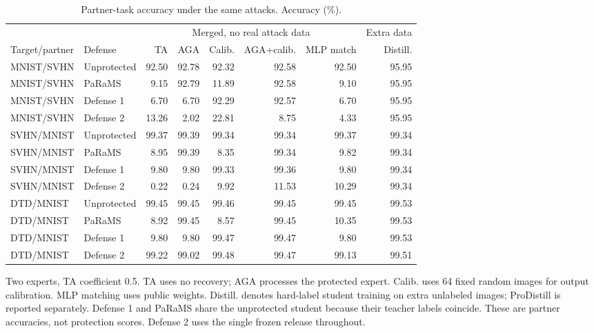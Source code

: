 \begin{table}[t]
\centering\small
\setlength{\tabcolsep}{4pt}
\caption{Partner-task accuracy under the same attacks. Accuracy (\%).}
\label{tab:partners}
\begin{tabular}{@{}llrrrrrr@{}}
\toprule
 &  & \multicolumn{5}{c}{Merged, no real attack data} & Extra data \\
\cmidrule(lr){3-7}\cmidrule(lr){8-8}
Target/partner & Defense & TA & AGA & Calib. & AGA+calib. & MLP match & Distill. \\
\midrule
MNIST/SVHN & Unprotected & 92.50 & 92.78 & 92.32 & 92.58 & 92.50 & 95.95 \\
MNIST/SVHN & PaRaMS & 9.15 & 92.79 & 11.89 & 92.58 & 9.10 & 95.95 \\
MNIST/SVHN & Defense 1 & 6.70 & 6.70 & 92.29 & 92.57 & 6.70 & 95.95 \\
MNIST/SVHN & Defense 2 & 13.26 & 2.02 & 22.81 & 8.75 & 4.33 & 95.95 \\
\midrule
SVHN/MNIST & Unprotected & 99.37 & 99.39 & 99.34 & 99.34 & 99.37 & 99.34 \\
SVHN/MNIST & PaRaMS & 8.95 & 99.39 & 8.35 & 99.34 & 9.82 & 99.34 \\
SVHN/MNIST & Defense 1 & 9.80 & 9.80 & 99.33 & 99.36 & 9.80 & 99.34 \\
SVHN/MNIST & Defense 2 & 0.22 & 0.24 & 9.92 & 11.53 & 10.29 & 99.34 \\
\midrule
DTD/MNIST & Unprotected & 99.45 & 99.45 & 99.46 & 99.45 & 99.45 & 99.53 \\
DTD/MNIST & PaRaMS & 8.92 & 99.45 & 8.57 & 99.45 & 10.35 & 99.53 \\
DTD/MNIST & Defense 1 & 9.80 & 9.80 & 99.47 & 99.47 & 9.80 & 99.53 \\
DTD/MNIST & Defense 2 & 99.22 & 99.02 & 99.48 & 99.47 & 99.13 & 99.51 \\
\bottomrule
\end{tabular}
\par\smallskip
\begin{minipage}{\textwidth}\footnotesize Two experts, TA coefficient 0.5. TA uses no recovery; AGA processes the protected expert. Calib. uses 64 fixed random images for output calibration. MLP matching uses public weights. Distill. denotes hard-label student training on extra unlabeled images; ProDistill is reported separately. Defense 1 and PaRaMS share the unprotected student because their teacher labels coincide. These are partner accuracies, not protection scores. Defense 2 uses the single frozen release throughout.\end{minipage}
\end{table}
